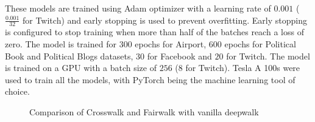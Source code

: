 \documentclass{article}
\theoremstyle{plain}
\theoremstyle{definition}
\theoremstyle{remark}
\begin{document}
These models are trained using Adam optimizer with a learning rate of $0.001$ ($\frac{0.001}{32}$ for Twitch) and early stopping is used to prevent overfitting. Early stopping is configured to stop training when more than half of the batches reach a loss of zero. The model is trained for $300$ epochs for Airport, $600$ epochs for Political Book and Political Blogs datasets, $30$ for Facebook and $20$ for Twitch.  The model is trained on a GPU with a batch size of $256$ ($8$ for Twitch). Tesla A 100s were used to train all the models, with PyTorch being the machine learning tool of choice.
\begin{figure}%
    \centering
    \qquad
    \caption{Comparison of Crosswalk and Fairwalk with vanilla deepwalk}%
    \label{fig:cw_fw_deepwalk}%
\end{figure}
\end{document}

